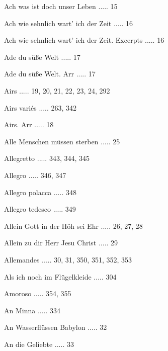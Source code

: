 \documentclass[twocolumn]{book}
\begin{document}
\newline 
Ach was ist doch unser Leben ..... 15

\newline 
Ach wie sehnlich wart' ich der Zeit ..... 16

\newline 
Ach wie sehnlich wart' ich der Zeit. Excerpts ..... 16

\newline 
Ade du süße Welt ..... 17

\newline 
Ade du süße Welt. Arr ..... 17

\newline 
Airs ..... 19, 20, 21, 22, 23, 24, 292

\newline 
Airs variés ..... 263, 342

\newline 
Airs. Arr ..... 18

\newline 
Alle Menschen müssen sterben ..... 25

\newline 
Allegretto ..... 343, 344, 345

\newline 
Allegro ..... 346, 347

\newline 
Allegro polacca ..... 348

\newline 
Allegro tedesco ..... 349

\newline 
Allein Gott in der Höh sei Ehr ..... 26, 27, 28

\newline 
Allein zu dir Herr Jesu Christ ..... 29

\newline 
Allemandes ..... 30, 31, 350, 351, 352, 353

\newline 
Als ich noch im Flügelkleide ..... 304

\newline 
Amoroso ..... 354, 355

\newline 
An Minna ..... 334

\newline 
An Wasserflüssen Babylon ..... 32

\newline 
An die Geliebte ..... 33
\end{document}
